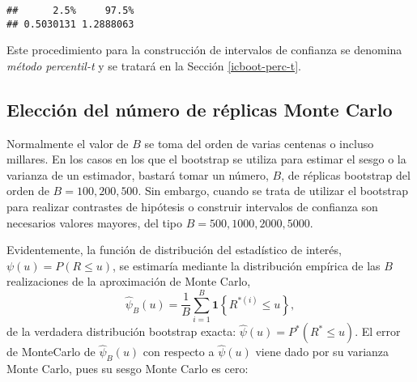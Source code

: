 \documentclass[]{book}
\newenvironment{Shaded}{\begin{snugshade}}{\end{snugshade}}
\newcommand{\KeywordTok}[1]{\textcolor[rgb]{0.13,0.29,0.53}{\textbf{#1}}}
\newcommand{\DecValTok}[1]{\textcolor[rgb]{0.00,0.00,0.81}{#1}}
\newcommand{\StringTok}[1]{\textcolor[rgb]{0.31,0.60,0.02}{#1}}
\newcommand{\CommentTok}[1]{\textcolor[rgb]{0.56,0.35,0.01}{\textit{#1}}}
\newcommand{\OperatorTok}[1]{\textcolor[rgb]{0.81,0.36,0.00}{\textbf{#1}}}
\newcommand{\NormalTok}[1]{#1}
\theoremstyle{break}
\theoremstyle{definition}
\theoremstyle{definition}
\theoremstyle{definition}
\theoremstyle{remark}
\begin{document}
\begin{Shaded}
\end{Shaded}

\begin{verbatim}
##      2.5%     97.5% 
## 0.5030131 1.2888063
\end{verbatim}

Este procedimiento para la construcción de intervalos de confianza se
denomina \emph{método percentil-t} y se tratará en la Sección
\ref{icboot-perc-t}.

\subsection{Elección del número de réplicas Monte
Carlo}\label{elecciuxf3n-del-nuxfamero-de-ruxe9plicas-monte-carlo}

Normalmente el valor de \(B\) se toma del orden de varias centenas o
incluso millares. En los casos en los que el bootstrap se utiliza para
estimar el sesgo o la varianza de un estimador, bastará tomar un número,
\(B\), de réplicas bootstrap del orden de \(B = 100, 200, 500\). Sin
embargo, cuando se trata de utilizar el bootstrap para realizar
contrastes de hipótesis o construir intervalos de confianza son
necesarios valores mayores, del tipo \(B = 500, 1000, 2000, 5000\).

Evidentemente, la función de distribución del estadístico de interés,
\(\psi \left( u \right) =P\left( R\leq u \right)\), se estimaría
mediante la distribución empírica de las \(B\) realizaciones de la
aproximación de Monte Carlo, \[\hat{\psi}_{B}\left( u \right) =
\frac{1}{B}\sum_{i=1}^{B}\mathbf{1}\left\{ R^{\ast (i)}\leq u\right\},\]
de la verdadera distribución bootstrap exacta:
\(\hat{\psi}\left(u \right) =P^{\ast}\left( R^{\ast}\leq u \right)\). El
error de MonteCarlo de \(\hat{\psi}_{B}\left( u \right)\) con respecto a
\(\hat{\psi}\left( u \right)\) viene dado por su varianza Monte Carlo,
pues su sesgo Monte Carlo es cero:
\end{document}
